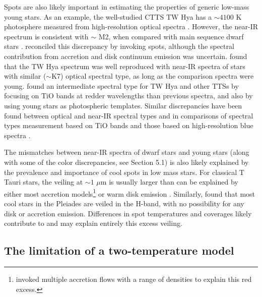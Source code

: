 \documentclass[twocolumn]{emulateapj}%
\begin{document}
Spots are also likely important in estimating the properties of generic low-mass young stars. As an example, the well-studied CTTS TW Hya has a $\sim 4100$ K photosphere measured from high-resolution optical spectra \citep[e.g.][]{yang05}.  However, the near-IR spectrum is consistent with $\sim$ M2, when compared with main sequence dwarf stars \citep{vacca11}.  \citet{debes13} reconciled this discrepancy by invoking spots, although the spectral contribution from accretion and disk continuum emission was uncertain.  \citet{mcclure13} found that the TW Hya spectrum was well reproduced with near-IR spectra of stars with similar ($\sim$K7) optical spectral type, as long as the comparison spectra were young.   \citet{herczeg14} found an intermediate spectral type for TW Hya and other TTSs by focusing on TiO bands at redder wavelengths than previous spectra, and also by using young stars as photospheric templates.  Similar discrepancies have been found between optical and near-IR spectral types \citep[e.g.][]{bouvier92,bary14,cottaar14} and in comparisons of spectral types measurement based on TiO bands and those based on high-resolution blue spectra \citep[see discussion in][]{herczeg14}.

The mismatches between near-IR spectra of dwarf stars and young stars (along with some of the color discrepancies, see Section 5.1) is also likely explained by the prevalence and importance of cool spots in low mass stars.  For classical T Tauri stars, the veiling at $\sim 1$ $\mu$m is usually larger than can be explained by either most accretion models\footnote{\citet{ingleby13} invoked multiple accretion flows with a range of densities to explain this red excess.} or warm disk emission \citep[e.g.][]{basri90,cieza05,fischer11,mcclure13}.  Similarly, \citet{cottaar14} found that most cool stars in the Pleiades are veiled in the H-band, with no possibility for any disk or accretion emission.  Differences in spot temperatures and coverages likely contribute to and may explain entirely this excess veiling.


\subsection{The limitation of a two-temperature model}
\end{document}
